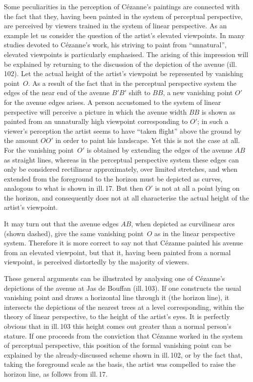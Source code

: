 

Some peculiarities in the perception of Cézanne's paintings are connected with the
fact that they, having been painted in the system of perceptual perspective, are
perceived by viewers trained in the system of linear perspective. As an example let
us consider the question of the artist's elevated viewpoints. In many studies
devoted to Cézanne's work, his striving to paint from ``unnatural'', elevated
viewpoints is particularly emphasised. The arising of this impression will be
explained by returning to the discussion of the depiction of the avenue (ill.\,102).
Let the actual height of the artist's viewpoint be represented by vanishing point~$O$.
As a result of the fact that in the perceptual perspective system the edges of the
near end of the avenue $B'B'$ shift to $BB$, a new vanishing point $O'$ for the
avenue edges arises. A person accustomed to the system of linear perspective will
perceive a picture in which the avenue width $BB$ is shown as painted from an
unnaturally high viewpoint corresponding to $O'$; in such a viewer's perception the
artist seems to have ``taken flight'' above the ground by the amount $OO'$ in order
to paint his landscape. Yet this is not the case at all. For the vanishing point~$O'$
is obtained by extending the edges of the avenue $AB$ as straight lines, whereas in
the perceptual perspective system these edges can only be considered rectilinear
approximately, over limited stretches, and when extended from the foreground to the
horizon must be depicted as curves, analogous to what is shown in ill.\,17. But
then $O'$ is not at all a point lying on the horizon, and consequently does not at
all characterise the actual height of the artist's viewpoint.


It may turn out that the avenue edges $AB$, when depicted as curvilinear arcs
(shown dashed), give the same vanishing point~$O$ as in the linear perspective
system. Therefore it is more correct to say not that Cézanne painted his avenue from
an elevated viewpoint, but that it, having been painted from a normal viewpoint, is
perceived distortedly by the majority of viewers.

These general arguments can be illustrated by analysing one of Cézanne's depictions
of the avenue at Jas de Bouffan (ill.\,103). If one constructs the usual vanishing
point and draws a horizontal line through it (the horizon line), it intersects the
depictions of the nearest trees at a level corresponding, within the theory of linear
perspective, to the height of the artist's eyes. It is perfectly obvious that in
ill.\,103 this height comes out greater than a normal person's stature. If one
proceeds from the conviction that Cézanne worked in the system of perceptual
perspective, this position of the formal vanishing point can be explained by the
already-discussed scheme shown in ill.\,102, or by the fact that, taking the
foreground scale as the basis, the artist was compelled to raise the horizon line,
as follows from ill.\,17.

